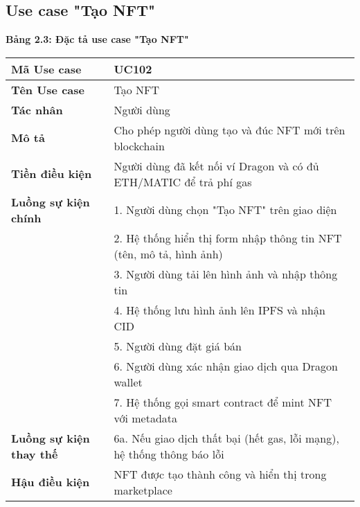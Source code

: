 \subsection{Use case "Tạo NFT"}
\textbf{Bảng 2.3: Đặc tả use case "Tạo NFT"}
\renewcommand{\arraystretch}{1.5}
\begin{tabular}{|l|p{10cm}|}
    \hline
    \rule{0pt}{3ex}\textbf{Mã Use case} & UC102 \\
    \hline
    \rule{0pt}{3ex}\textbf{Tên Use case} & Tạo NFT \\
    \hline
    \rule{0pt}{3ex}\textbf{Tác nhân} & Người dùng \\
    \hline
    \rule{0pt}{3ex}\textbf{Mô tả} & Cho phép người dùng tạo và đúc NFT mới trên blockchain \\
    \hline
    \rule{0pt}{3ex}\textbf{Tiền điều kiện} & Người dùng đã kết nối ví Dragon và có đủ ETH/MATIC để trả phí gas \\
    \hline
    \rule{0pt}{3ex}\textbf{Luồng sự kiện chính} & 1. Người dùng chọn "Tạo NFT" trên giao diện \\
    & 2. Hệ thống hiển thị form nhập thông tin NFT (tên, mô tả, hình ảnh) \\
    & 3. Người dùng tải lên hình ảnh và nhập thông tin \\
    & 4. Hệ thống lưu hình ảnh lên IPFS và nhận CID \\
    & 5. Người dùng đặt giá bán \\
    & 6. Người dùng xác nhận giao dịch qua Dragon wallet \\
    & 7. Hệ thống gọi smart contract để mint NFT với metadata \\
    \hline
    \rule{0pt}{3ex}\textbf{Luồng sự kiện thay thế} & 6a. Nếu giao dịch thất bại (hết gas, lỗi mạng), hệ thống thông báo lỗi \\
    \hline
    \rule{0pt}{3ex}\textbf{Hậu điều kiện} & NFT được tạo thành công và hiển thị trong marketplace \\
    \hline
\end{tabular}

